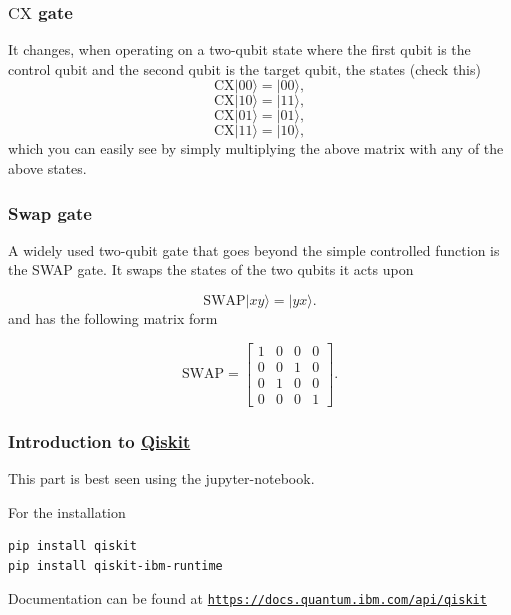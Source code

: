 \documentclass{beamer}
\begin{document}
\begin{frame}
\frametitle{$\mathrm{CX}$ gate}

It changes, when operating on a two-qubit state where the first qubit is the control qubit and the second qubit is the target qubit, the states (check this)
\[
\mathrm{CX}\vert 00\rangle=\vert 00\rangle,
\]
\[
\mathrm{CX}\vert 10\rangle= \vert 11\rangle,
\]
\[
\mathrm{CX}\vert 01\rangle= \vert 01\rangle,
\]
\[
\mathrm{CX}\vert 11\rangle= \vert 10\rangle,
\]
which you can easily see by simply multiplying the above matrix with any of the above states.
\end{frame}

\begin{frame}
\frametitle{Swap gate}

A widely used two-qubit gate that goes beyond the simple controlled function is the SWAP gate. It swaps the states of the two qubits it acts upon

\[
\mathrm{SWAP}\vert xy\rangle=\vert yx\rangle.
\]
and has the following matrix form

\[
\mathrm{SWAP}
=\begin{bmatrix}
1 & 0 & 0 & 0 \\
0 & 0 & 1 & 0 \\
0 & 1 & 0 & 0 \\
0 & 0 & 0 & 1
\end{bmatrix}.
\]
\end{frame}

\begin{frame}
\frametitle{Introduction to \href{{https://qiskit.org/}}{Qiskit}}

This part is best seen using the jupyter-notebook.

For the installation



\begin{verbatim}
pip install qiskit
pip install qiskit-ibm-runtime

\end{verbatim}


Documentation can be found at \href{{https://docs.quantum.ibm.com/api/qiskit}}{\nolinkurl{https://docs.quantum.ibm.com/api/qiskit}}
\end{frame}
\end{document}
